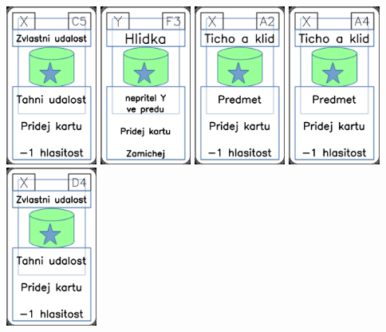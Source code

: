\documentclass[a4paper]{article}
\begin{document}
	\includegraphics[width=3.0cm]{img-5_14}
	\includegraphics[width=3.0cm]{img-5_27}
	\includegraphics[width=3.0cm]{img-5_1}
	\includegraphics[width=3.0cm]{img-5_3}
	\includegraphics[width=3.0cm]{img-5_18}
\end{document}

